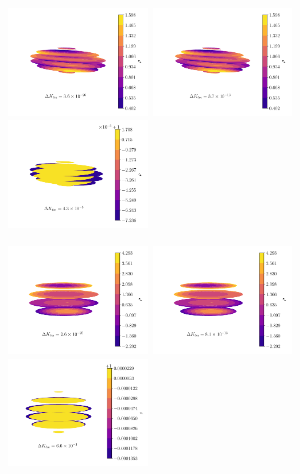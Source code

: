 \documentclass[fleqn,usenatbib]{mnras}
\begin{document}
\begin{figure}
  \centering
  \includegraphics[width=0.33\textwidth]{figs/asym-ell-likelihood.pdf}\hfill
  \includegraphics[width=0.33\textwidth]{figs/asym-ell-harmonic.pdf}\hfill
  \includegraphics[width=0.33\textwidth]{figs/asym-ell-lumpy.pdf}

  \includegraphics[width=0.33\textwidth]{figs/sym-ell-likelihood.pdf}\hfill
  \includegraphics[width=0.33\textwidth]{figs/sym-ell-harmonic.pdf}\hfill
  \includegraphics[width=0.33\textwidth]{figs/sym-ell-lumpy.pdf}


\end{figure}
\end{document}
